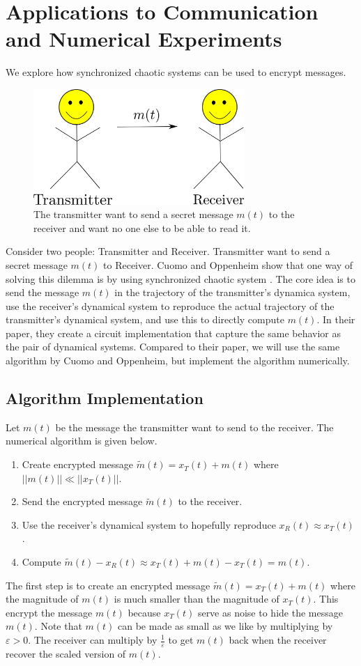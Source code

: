 \documentclass[12pt]{article}
\begin{document}
    \section{Applications to Communication and Numerical Experiments}
    We explore how synchronized chaotic systems can be used to encrypt messages. 
    \begin{figure}[H]
        \includegraphics[width=8cm]{drawing.png}
        \centering
        \caption{The transmitter want to send a secret message $m(t)$ to the receiver and want no one else to be able to read it.}
    \end{figure}
    Consider two people: Transmitter and Receiver. Transmitter want to send a secret message $m(t)$ to Receiver. Cuomo and Oppenheim show that one way of solving this dilemma is by using synchronized chaotic system \cite{cuomo1993}. The core idea is to send the message $m(t)$ in the trajectory of the transmitter's dynamica system, use the receiver's dynamical system to reproduce the actual trajectory of the transmitter's dynamical system, and use this to directly compute $m(t)$. In their paper, they create a circuit implementation that capture the same behavior as the pair of dynamical systems. Compared to their paper, we will use the same algorithm by Cuomo and Oppenheim, but implement the algorithm numerically. 
    \subsection{Algorithm Implementation}
    Let $m(t)$ be the message the transmitter want to send to the receiver. The numerical algorithm is given below. 
    \begin{enumerate}
      \item Create encrypted message $\widetilde{m}(t) = x_T (t) + m(t)$ where $||m(t)|| \ll ||x_T(t)||$. 
        \item Send the encrypted message $\widetilde{m}(t)$ to the receiver. 
        \item Use the receiver's dynamical system to hopefully reproduce $x_R(t) \approx x_T(t)$. 
        \item Compute $\widetilde{m}(t) - x_R(t) \approx x_T (t) + m(t) - x_T(t) = m(t)$. 
    \end{enumerate}
    The first step is to create an encrypted message $\widetilde{m}(t) = x_T (t) + m(t)$ where the magnitude of $m(t)$ is much smaller than the magnitude of $x_T(t)$. This encrypt the message $m(t)$ because $x_T(t)$ serve as noise to hide the message $m(t)$. Note that $m(t)$ can be made as small as we like by multiplying by $\varepsilon > 0$. The receiver can multiply by $\frac{1}{\varepsilon}$ to get $m(t)$ back when the receiver recover the scaled version of $m(t)$.  
\end{document}
